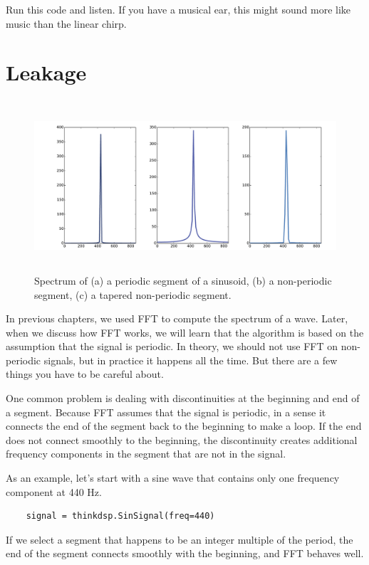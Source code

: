\documentclass[12pt]{book}
\begin{document}
Run this code and listen.  If you have a musical ear, this might
sound more like music than the linear chirp.


\section{Leakage}

\begin{figure}
\centerline{\includegraphics[height=2.5in]{figs/windowing1.pdf}}
\caption{Spectrum of (a) a periodic segment of a sinusoid, (b)
a non-periodic segment, (c) a tapered non-periodic segment.}
\label{fig.windowing1}
\end{figure}

In previous chapters, we used FFT to compute the spectrum of a wave.
Later, when we discuss how FFT works, we will learn that the algorithm
is based on the assumption that the signal is periodic.  In theory, we
should not use FFT on non-periodic signals, but in practice it happens
all the time.  But there are a few things you have to be careful about.

One common problem is dealing with discontinuities at the beginning
and end of a segment.  Because FFT assumes that the signal is periodic,
in a sense it connects the end of the segment back to the beginning
to make a loop.  If the end does not connect smoothly to the beginning,
the discontinuity creates additional frequency components in the
segment that are not in the signal.

As an example, let's start with a sine wave that contains only
one frequency component at 440 Hz.

\begin{verbatim}
    signal = thinkdsp.SinSignal(freq=440)
\end{verbatim}

If we select a segment that happens to be an integer multiple of
the period, the end of the segment connects smoothly with the
beginning, and FFT behaves well.
\end{document}
